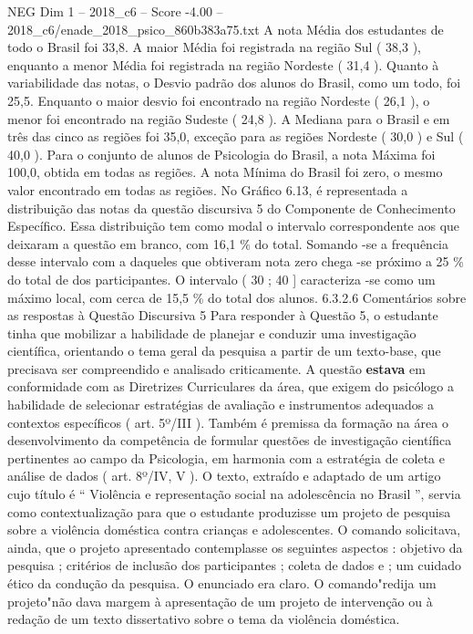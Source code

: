 \begin{textsample}{NEG Dim 1 – 2018\_c6 – Score -4.00 – 2018\_c6/enade\_2018\_psico\_860b383a75.txt}
A nota Média dos estudantes de todo o Brasil foi 33,8.
A maior Média foi registrada na região Sul ( 38,3 ), enquanto a menor Média foi registrada na região Nordeste ( 31,4 ).
Quanto à variabilidade das notas, o Desvio padrão dos alunos do Brasil, como um todo, foi 25,5.
Enquanto o maior desvio foi encontrado na região Nordeste ( 26,1 ), o menor foi encontrado na região Sudeste ( 24,8 ).
A Mediana para o Brasil e em três das cinco as regiões foi 35,0, exceção para as regiões Nordeste ( 30,0 ) e Sul ( 40,0 ).
Para o conjunto de alunos de Psicologia do Brasil, a nota Máxima foi 100,0, obtida em todas as regiões.
A nota Mínima do Brasil foi zero, o mesmo valor encontrado em todas as regiões.
No Gráfico 6.13, é representada a distribuição das notas da questão discursiva 5 do Componente de Conhecimento Específico.
Essa distribuição tem como modal o intervalo correspondente aos que deixaram a questão em branco, com 16,1 \% do total.
Somando -se a frequência desse intervalo com a daqueles que obtiveram nota zero chega -se próximo a 25 \% do total de dos participantes.
O intervalo ( 30 ; 40 ] caracteriza -se como um máximo local, com cerca de 15,5 \% do total dos alunos. 6.3.2.6 Comentários sobre as respostas à Questão Discursiva 5 Para responder à Questão 5, o estudante tinha que mobilizar a habilidade de planejar e conduzir uma investigação científica, orientando o tema geral da pesquisa a partir de um texto-base, que precisava ser compreendido e analisado criticamente.
A questão \textbf{estava} em conformidade com as Diretrizes Curriculares da área, que exigem do psicólogo a habilidade de selecionar estratégias de avaliação e instrumentos adequados a contextos específicos ( art. 5º/III ).
Também é premissa da formação na área o desenvolvimento da competência de formular questões de investigação científica pertinentes ao campo da Psicologia, em harmonia com a estratégia de coleta e análise de dados ( art. 8º/IV, V ).
O texto, extraído e adaptado de um artigo cujo título é “ Violência e representação social na adolescência no Brasil ”, servia como contextualização para que o estudante produzisse um projeto de pesquisa sobre a violência doméstica contra crianças e adolescentes.
O comando solicitava, ainda, que o projeto apresentado contemplasse os seguintes aspectos : objetivo da pesquisa ; critérios de inclusão dos participantes ; coleta de dados e ; um cuidado ético da condução da pesquisa.
O enunciado era claro.
O comando"redija um projeto"não dava margem à apresentação de um projeto de intervenção ou à redação de um texto dissertativo sobre o tema da violência doméstica.

\end{textsample}
